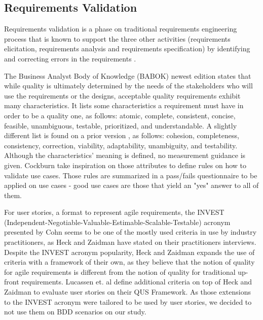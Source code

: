 \subsection{Requirements Validation}

Requirements validation is a phase on traditional requirements engineering process that is known to support the three other activities (requirements elicitation, requirements analysis and requirements specification) by identifying and correcting errors in the requirements \cite{Heikkila_2015}. 

The Business Analyst Body of Knowledge (BABOK) newest edition \cite{Babok_2015} states that while quality is ultimately determined by the needs of the stakeholders who will use the requirements or the designs, acceptable quality requirements exhibit many characteristics. It lists some characteristics a requirement must have in order to be a quality one, as follows: atomic, complete, consistent, concise, feasible, unambiguous, testable, prioritized, and understandable. A slightly different list is found on a prior version \cite{Babok_2009}, as follows: cohesion, completeness, consistency, correction, viability, adaptability, unambiguity, and testability. Although the characteristics' meaning is defined, no measurement guidance is given. Cockburn \cite{Cockburn_2000} take inspiration on those attributes to define rules on how to validate use cases. Those rules are summarized in a pass/fails questionnaire to be applied on use cases - good use cases are those that yield an "yes" answer to all of them.

For user stories, a format to represent agile requirements, the INVEST (Independent-Negotiable-Valuable-Estimable-Scalable-Testable) acronym presented by Cohn \cite{Cohn_2004} seems to be one of the mostly used criteria in use by industry practitioners, as Heck and Zaidman \cite{Heck_2014} have stated on their practitioners interviews. Despite the INVEST acronym popularity, Heck and Zaidman \cite{Heck_2014} \cite{Heck_2015} expands the use of criteria with a framework of their own, as they believe that the notion of quality for agile requirements is different from the notion of quality for traditional up-front requirements. Lucassen et. al \cite{Lucassen_et_dot_al_2015} define additional criteria on top of Heck and Zaidman \cite{Heck_2015} to evaluate user stories on their QUS Framework. As those extensions to the INVEST acronym were tailored to be used by user stories, we decided to not use them on BDD scenarios on our study.

